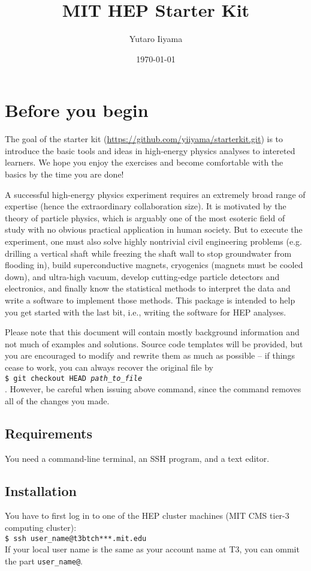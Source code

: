 \documentclass[12pt]{article}
\title{MIT HEP Starter Kit}
\author{Yutaro Iiyama}
\date{\today}
\newcommand{\terminal}[1]{\vspace{3pt}\texttt{\$ #1} \\}
\begin{document}
\maketitle

\section*{Before you begin}
The goal of the starter kit (\url{https://github.com/yiiyama/starterkit.git}) is to introduce the basic tools and ideas in high-energy physics analyses to intereted learners. We hope you enjoy the exercises and become comfortable with the basics by the time you are done!

A successful high-energy physics experiment requires an extremely broad range of expertise (hence the extraordinary collaboration size). It is motivated by the theory of particle physics, which is arguably one of the most esoteric field of study with no obvious practical application in human society. But to execute the experiment, one must also solve highly nontrivial civil engineering problems (e.g. drilling a vertical shaft while freezing the shaft wall to stop groundwater from flooding in), build superconductive magnets, cryogenics (magnets must be cooled down), and ultra-high vacuum, develop cutting-edge particle detectors and electronics, and finally know the statistical methods to interpret the data and write a software to implement those methods. This package is intended to help you get started with the last bit, i.e., writing the software for HEP analyses.

Please note that this document will contain mostly background information and not much of examples and solutions. Source code templates will be provided, but you are encouraged to modify and rewrite them as much as possible -- if things cease to work, you can always recover the original file by \\
\terminal{git checkout HEAD \textit{path\_to\_file}}.
However, be careful when issuing above command, since the command removes all of the changes you made.

\subsection*{Requirements}
You need a command-line terminal, an SSH program, and a text editor.

\subsection*{Installation}
You have to first log in to one of the HEP cluster machines (MIT CMS tier-3 computing cluster): \\
\terminal{ssh user\_name@t3btch***.mit.edu}
If your local user name is the same as your account name at T3, you can ommit the part \texttt{user\_name@}.
\end{document}
